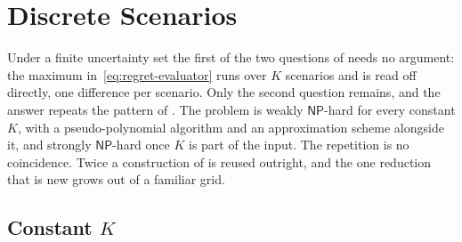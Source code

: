 %
%
%

\section{Discrete Scenarios}\label{sec:regret-complexity-discrete}

Under a finite uncertainty set the first of the two questions of  needs no argument: the maximum in~\eqref{eq:regret-evaluator} runs over $K$ scenarios and is read off directly, one difference per scenario.
Only the second question remains, and the answer repeats the pattern of .
The problem is weakly $\mathsf{NP}$-hard for every constant $K$, with a pseudo-polynomial algorithm and an approximation scheme alongside it, and strongly $\mathsf{NP}$-hard once $K$ is part of the input.
The repetition is no coincidence.
Twice a construction of  is reused outright, and the one reduction that is new grows out of a familiar grid.

\subsection{Constant \texorpdfstring{$K$}{K}}\label{sec:regret-kconst}

